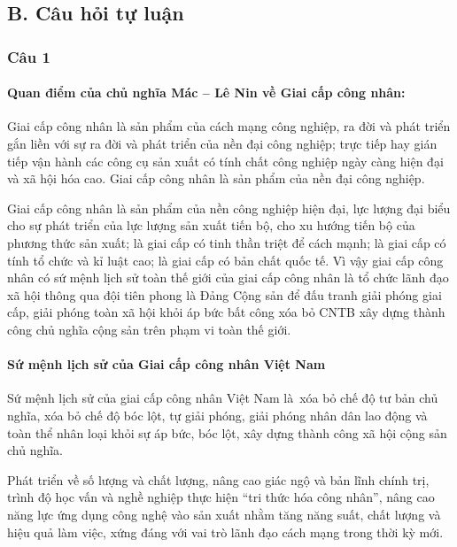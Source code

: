 \vspace{1cm}
\subsection*{\textbf{\fontsize{16pt}{0pt}\selectfont B. Câu hỏi tự luận}}
\subsubsection*{\textbf{\fontsize{15pt}{0pt}\selectfont Câu 1}}

\paragraph*{{\textbf{Quan điểm của chủ nghĩa Mác – Lê Nin về Giai cấp công nhân:}}}\mbox{}

Giai cấp công nhân là sản phẩm của cách mạng công nghiệp, ra đời và phát triển gắn liền với sự ra đời và phát triển của nền đại công nghiệp; trực tiếp hay gián tiếp vận hành các công cụ sản xuất có tính chất công nghiệp ngày càng hiện đại và xã hội hóa cao. Giai cấp công nhân là sản phẩm của nền đại công nghiệp.

Giai cấp công nhân là sản phẩm của nền công nghiệp hiện đại, lực lượng đại biểu cho sự phát triển của lực lượng sản xuất tiến bộ, cho xu hướng tiến bộ của phương thức sản xuất; là giai cấp có tinh thần triệt để cách mạnh; là giai cấp có tính tổ chức và kỉ luật cao; là giai cấp có bản chất quốc tế. Vì vậy giai cấp công nhân có sứ mệnh lịch sử toàn thế giới của giai cấp công nhân là tổ chức lãnh đạo xã hội thông qua đội tiên phong là Đảng Cộng sản để đấu tranh giải phóng giai cấp, giải phóng toàn xã hội khỏi áp bức bất công xóa bỏ CNTB xây dựng thành công chủ nghĩa cộng sản trên phạm vi toàn thế giới.

\paragraph*{{\textbf{Sứ mệnh lịch sử của Giai cấp công nhân Việt Nam}}}\mbox{}

Sứ mệnh lịch sử của giai cấp công nhân Việt Nam là xóa bỏ chế độ tư bản chủ nghĩa, xóa bỏ chế độ bóc lột, tự giải phóng, giải phóng nhân dân lao động và toàn thể nhân loại khỏi sự áp bức, bóc lột, xây dựng thành công xã hội cộng sản chủ nghĩa.

Phát triển về số lượng và chất lượng, nâng cao giác ngộ và bản lĩnh chính trị, trình độ học vấn và nghề nghiệp thực hiện “tri thức hóa công nhân”, nâng cao năng lực ứng dụng công nghệ vào sản xuất nhằm tăng năng suất, chất lượng và hiệu quả làm việc, xứng đáng với vai trò lãnh đạo cách mạng trong thời kỳ mới.

